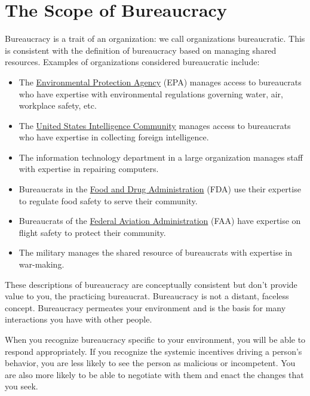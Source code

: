 \section{The Scope of Bureaucracy}
Bureaucracy is a trait of an organization: we call organizations bureaucratic. This is consistent with the definition of bureaucracy based on managing \glspl{shared resource}.  \iftoggle{glossaryinmargin}{\marginpar{[Glossary]}}{}
Examples of organizations considered bureaucratic include:
  \begin{itemize}
      \item The \href{https://www.epa.gov/}{Environmental Protection Agency} (EPA) manages access to bureaucrats who have expertise with environmental regulations governing water, air, workplace safety, etc.
      \item The \href{https://www.intelligence.gov/}{United States Intelligence Community} manages access to bureaucrats who have expertise in collecting foreign intelligence.
      \item The information technology department in a large organization manages staff with expertise in repairing computers.
      \item Bureaucrats in the \href{https://www.fda.gov/}{Food and Drug Administration} (FDA) use their expertise to regulate food safety to serve their community.
      \item Bureaucrats of the \href{https://www.faa.gov/}{Federal Aviation Administration} (FAA) have expertise on flight safety to protect their community.
      \item The military manages the shared resource of bureaucrats with expertise in war-making.
  \end{itemize}

These descriptions of bureaucracy are conceptually consistent but don't provide value to you, the practicing bureaucrat. Bureaucracy is not a distant, faceless concept. Bureaucracy permeates your environment and is the basis for many interactions you have with other people. 

When you recognize bureaucracy specific to your environment, you will be able to respond appropriately. If you recognize the systemic incentives driving a person's behavior, you are less likely to see the person as malicious or incompetent. You are also more likely to be able to negotiate with them and enact the changes that you seek.